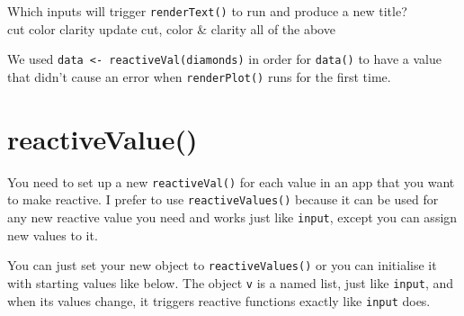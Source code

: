 \documentclass[
  oneside]{book}
\begin{document}
Which inputs will trigger \texttt{renderText}\texttt{()} to run and produce a new title?\\
cut color clarity update cut, color \& clarity all of the above

\begin{info}
We used \texttt{data\ \textless{}-\ reactiveVal(diamonds)} in order for \texttt{data}\texttt{()} to have a value that didn't cause an error when \texttt{renderPlot}\texttt{()} runs for the first time.

\end{info}

\hypertarget{reactivevalue}{%
\section{reactiveValue()}\label{reactivevalue}}

You need to set up a new \texttt{reactiveVal}\texttt{()} for each value in an app that you want to make reactive. I prefer to use \texttt{reactiveValues}\texttt{()} because it can be used for any new reactive value you need and works just like \texttt{input}, except you can assign new values to it.

You can just set your new object to \texttt{reactiveValues}\texttt{()} or you can initialise it with starting values like below. The object \texttt{v} is a named list, just like \texttt{input}, and when its values change, it triggers reactive functions exactly like \texttt{input} does.
\end{document}
